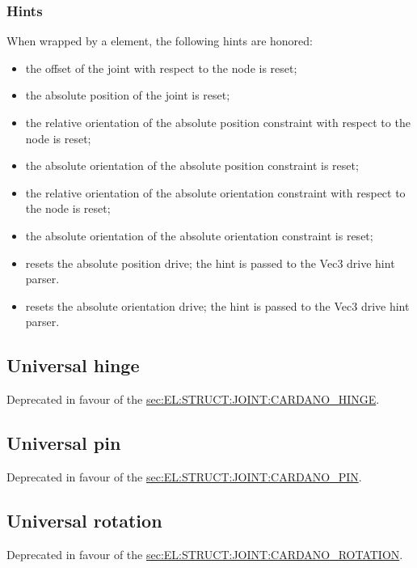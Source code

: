\subsubsection{Hints}
When wrapped by a  element, the following hints are honored:
\begin{itemize}
\item {} the offset of the joint
with respect to the node is reset;
\item {} the absolute position of the joint
is reset;
\item {} the relative orientation
of the absolute position constraint with respect to the node is reset;
\item {} the absolute orientation 
of the absolute position constraint is reset;
\item {} the relative orientation
of the absolute orientation constraint with respect to the node is reset;
\item {} the absolute orientation 
of the absolute orientation constraint is reset;
\item {} resets the absolute position drive;
the hint is passed to the Vec3 drive hint parser.
\item {} resets the absolute orientation drive;
the hint is passed to the Vec3 drive hint parser.
\end{itemize}




\subsection{Universal hinge}
\label{sec:EL:STRUCT:JOINT:UNIVERSAL_HINGE}
Deprecated in favour of the
\hyperref{\kw{cardano hinge}}{\kw{cardano hinge} (see Section~}{)}{sec:EL:STRUCT:JOINT:CARDANO_HINGE}.



\subsection{Universal pin}
\label{sec:EL:STRUCT:JOINT:UNIVERSAL_PIN}
Deprecated in favour of the
\hyperref{\kw{cardano pin}}{\kw{cardano pin} (see Section~}{)}{sec:EL:STRUCT:JOINT:CARDANO_PIN}.



\subsection{Universal rotation}
\label{sec:EL:STRUCT:JOINT:UNIVERSAL_ROTATION}
Deprecated in favour of the
\hyperref{\kw{cardano rotation}}{\kw{cardano rotation} (see Section~}{)}{sec:EL:STRUCT:JOINT:CARDANO_ROTATION}.

